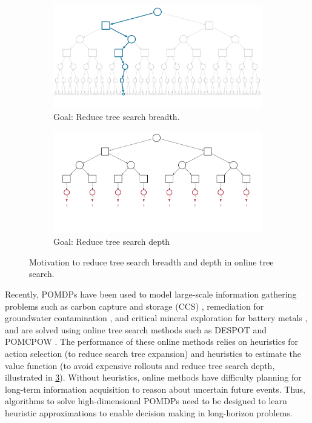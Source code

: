 \begin{figure}[t]
    \centering
    \begin{subfigure}[t]{0.48\linewidth}
        \centering
        \includegraphics[width=\linewidth]{diagrams/betazero/reduce-breadth.pdf}
        \caption{Goal: Reduce tree search breadth.}
        \label{fig:reduce_depth}
    \end{subfigure}
    \hfill
    \begin{subfigure}[t]{0.48\linewidth}
        \centering
        \includegraphics[width=\linewidth]{diagrams/betazero/reduce-depth.pdf}
        \caption{Goal: Reduce tree search depth}
        \label{fig:reduce_breadth}
    \end{subfigure}
    \caption{Motivation to reduce tree search breadth and depth in online tree search.}
    \label{fig:tree_search_motivation}
\end{figure}

Recently, POMDPs have been used to model large-scale information gathering problems such as carbon capture and storage (CCS) \cite{corso2022pomdp,wang2023optimizing}, remediation for groundwater contamination \cite{wang2022sequential}, and critical mineral exploration for battery metals \cite{mern2023intelligent}, and are solved using online tree search methods such as DESPOT \cite{ye2017despot} and POMCPOW \cite{sunberg2018online}.
The performance of these online methods relies on heuristics for action selection (to reduce search tree expansion) and heuristics to estimate the value function (to avoid expensive rollouts and reduce tree search depth, illustrated in \cref{fig:tree_search_motivation}).
Without heuristics, online methods have difficulty planning for long-term information acquisition to reason about uncertain future events.
Thus, algorithms to solve high-dimensional POMDPs need to be designed to learn heuristic approximations to enable decision making in long-horizon problems.

